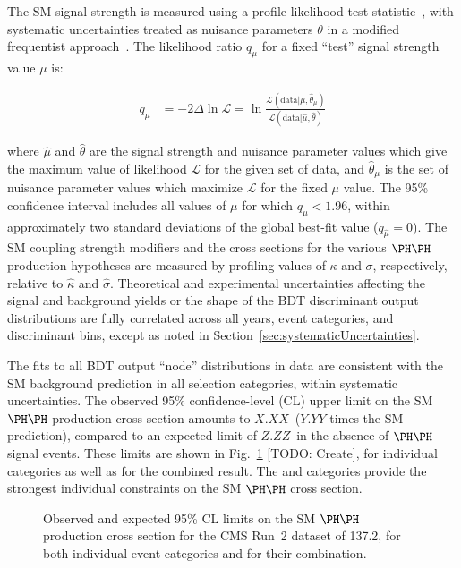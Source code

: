 The SM signal strength is measured using a profile likelihood test
statistic~\cite{Cowan:2010js}, with systematic uncertainties treated as nuisance
parameters $\theta$ in a modified frequentist approach~\cite{ATL-PHYS-PUB-2011-011}.
The likelihood ratio $q_{\mu}$ for a fixed ``test'' signal strength value $\mu$ is:
\begin{linenomath}
\begin{equation*}
  \begin{aligned}
    q_{\mu}  &  = -2 \Delta \ln \mathcal{L} = \ln \frac{\mathcal{L}(\mathrm{data}|\mu,\hat{\theta}_{\mu})}{\mathcal{L}(\mathrm{data}|\hat{\mu},\hat{\theta})}
  \end{aligned}
\end{equation*}
\end{linenomath}
where $\hat{\mu}$ and $\hat{\theta}$ are the signal strength and nuisance
parameter values which give the maximum value of likelihood $\mathcal{L}$
for the given set of data, and $\hat{\theta}_{\mu}$ is the set of nuisance
parameter values which maximize $\mathcal{L}$ for the fixed $\mu$ value.
The 95\% confidence interval includes all values of $\mu$ for which $q_{\mu} < 1.96$,
within approximately two standard deviations of the global best-fit value ($q_{\hat{\mu}} = 0$).
The SM coupling strength modifiers and the cross sections for the various $\HH$ production hypotheses
are measured by profiling values of $\kappa$ and $\sigma$, respectively,
relative to $\hat{\kappa}$ and $\hat{\sigma}$.
Theoretical and experimental uncertainties affecting the signal and
background yields or the shape of the BDT discriminant output distributions are fully
correlated across all years, event categories, and discriminant bins,
except as noted in Section~\ref{sec:systematicUncertainties}.

The fits to all BDT output ``node'' distributions in data are consistent with the
SM background prediction in all selection categories, within systematic uncertainties.
The observed 95\% confidence-level (CL) upper limit on the SM $\HH$ production cross section
amounts to $X.XX$~\pb ($Y.YY$ times the SM prediction), compared to an
expected limit of $Z.ZZ$~\pb in the absence of $\HH$ signal events.
These limits are shown in Fig.~\ref{fig:HH_limits_SM} [TODO: Create],
for individual categories as well as for the combined result.
The \lttt and \lllnot categories provide the strongest individual
constraints on the SM $\HH$ cross section.

\begin{figure}
  \centering
  \caption{
    Observed and expected 95\% CL limits on the SM $\HH$ production cross section
    for the CMS Run~2 dataset of 137.2\fbinv, for both individual event categories
    and for their combination.
  }
  \label{fig:HH_limits_SM}
\end{figure}


